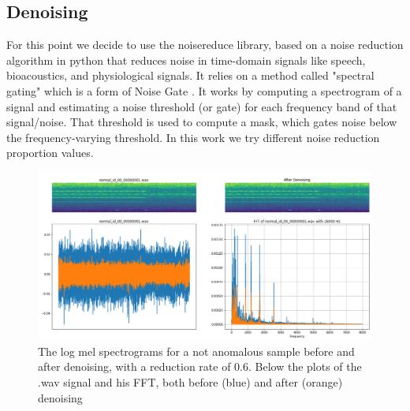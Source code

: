 \documentclass{article}
\begin{document}
    \subsection{Denoising}
     For this point we decide to use the noisereduce \cite{tim_sainburg_2019_3243139} library, based on a noise reduction algorithm in python that reduces noise in time-domain signals like speech, bioacoustics, and physiological signals. It relies on a method called "spectral gating" which is a form of Noise Gate \cite{sainburg2020finding}. It works by computing a spectrogram of a signal and estimating a noise threshold (or gate) for each frequency band of that signal/noise. That threshold is used to compute a mask, which gates noise below the frequency-varying threshold. In this work we try different noise reduction proportion values.
     \begin{figure}
        \centering
        \includegraphics[width=\linewidth]{assets/mod_out_normal_id_00_00000001.wav.png}
        \caption{The log mel spectrograms for a not anomalous sample before and after denoising, with a reduction rate of 0.6. Below the plots of the .wav signal and his FFT, both before (blue) and after (orange) denoising}
        \label{fig:normal_id_denos}
    \end{figure}
\end{document}
